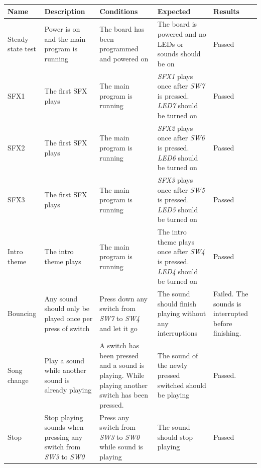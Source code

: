 \documentclass[a4paper,11pt]{article}
\begin{document}
\begin{center}
\renewcommand{\arraystretch}{1.1} %
\begin{tabular}[pos]{|m{45pt}|m{80pt}|m{90pt}|m{105pt}|m{60pt}|}
\hline  \textbf{Name} & \textbf{Description} & \textbf{Conditions} & \textbf{Expected} & \textbf{Results} \\ 

\hline Steady-state test & Power is on and the main program is running & The board has been programmed and powered on & The board is powered and no LEDs or sounds should be on & Passed \\

\hline SFX1 & The first SFX plays & The main program is running & \emph{SFX1} plays once after \emph{SW7} is pressed. \emph{LED7} should be turned on & Passed \\

\hline SFX2 & The first SFX plays & The main program is running & \emph{SFX2} plays once after \emph{SW6} is pressed. \emph{LED6} should be turned on & Passed \\

\hline SFX3 & The first SFX plays & The main program is running & \emph{SFX3} plays once after \emph{SW5} is pressed. \emph{LED5} should be turned on & Passed \\ 

\hline Intro theme & The intro theme plays & The main program is running & The intro theme plays once after \emph{SW4} is pressed. \emph{LED4} should be turned on & Passed \\

\hline Bouncing & Any sound should only be played once per press of switch & Press down any switch from \emph{SW7} to \emph{SW4} and let it go & The sound should finish playing without any interruptions & Failed. The sounds is interrupted before finishing. \\

\hline Song change & Play a sound while another sound is already playing & A switch has been pressed and a sound is playing. While playing another switch has been pressed. & The sound of the newly pressed switched should be playing & Passed. \\ 

\hline Stop & Stop playing sounds when pressing any switch from \emph{SW3} to \emph{SW0} & Press any switch from \emph{SW3} to \emph{SW0} while sound is playing & The sound should stop playing & Passed \\ 

\hline 
\end{tabular} 
\end{center}
\end{document}
